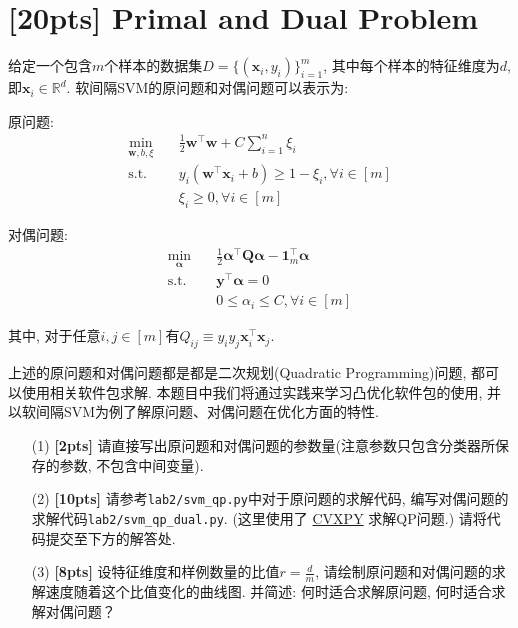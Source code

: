 \documentclass[a4paper,UTF8]{article}
\numberwithin{equation}{section}
\theoremstyle{definition}
\newcommand{\vct}[1]{\boldsymbol{#1}} %
\newcommand{\vw}{\vct{w}}
\newcommand{\vx}{\vct{x}}
\newcommand{\vy}{\vct{y}}
\newcommand{\ones}{\vct{1}}
\newcommand{\mat}[1]{\boldsymbol{#1}} %
\begin{document}
\newpage

\section{[20pts] Primal and Dual Problem}
给定一个包含$m$个样本的数据集$D=\{(\vx_i, y_i)\}_{i=1}^{m}$, 其中每个样本的特征维度为$d$, 即$\vx_i \in \mathbb{R}^d$. 软间隔SVM的原问题和对偶问题可以表示为: 
\vspace{8pt}

\begin{minipage}{0.5\textwidth}
原问题:
$$
\begin{aligned}
\min_{\vw, b, \xi} \quad & \frac{1}{2} \vw^{\top} \vw+C \sum_{i=1}^{n} \xi_{i} \\
\text {s.t.}\quad & y_{i}\left(\vw^{\top} \vx_{i}+b\right) \geq 1-\xi_{i}, \forall i \in [m]\\
\quad &\xi_{i} \geq 0, \forall i \in [m]
\end{aligned}
$$
\end{minipage}
\begin{minipage}{0.5\textwidth}
对偶问题:
$$
\begin{aligned}
\min_{\bm{\alpha}}\quad &  \frac{1}{2} \bm{\alpha}^{\top} \mat{Q} \bm{\alpha}-\ones_m^{\top} \bm{\alpha} \\
\text {s.t.}\quad &  \vy^{\top} \bm{\alpha}=0 \\
\quad & 0 \leq \alpha_{i} \leq C, \forall i \in [m]
\end{aligned}
$$
\end{minipage}

\vspace{5pt}
其中, 对于任意$i, j \in [m]$有$Q_{i j} \equiv y_{i} y_{j} \vx^\top_i \vx_j$. 
\vspace{5pt}

上述的原问题和对偶问题都是都是二次规划(Quadratic Programming)问题, 都可以使用相关软件包求解. 本题目中我们将通过实践来学习凸优化软件包的使用, 并以软间隔SVM为例了解原问题、对偶问题在优化方面的特性.

\begin{enumerate}
    \item[(1)] \textbf{[2pts]} 请直接写出原问题和对偶问题的参数量(注意参数只包含分类器所保存的参数, 不包含中间变量).
    \item[(2)] \textbf{[10pts]} 请参考\texttt{lab2/svm\_qp.py}中对于原问题的求解代码, 编写对偶问题的求解代码\texttt{lab2/svm\_qp\_dual.py}. (这里使用了 \href{https://www.cvxpy.org/}{CVXPY} 求解QP问题.) 请将代码提交至下方的解答处.
    \item[(3)] \textbf{[8pts]} 设特征维度和样例数量的比值$r = \frac{d}{m}$, 请绘制原问题和对偶问题的求解速度随着这个比值变化的曲线图. 并简述: 何时适合求解原问题, 何时适合求解对偶问题？
\end{enumerate}
\end{document}
